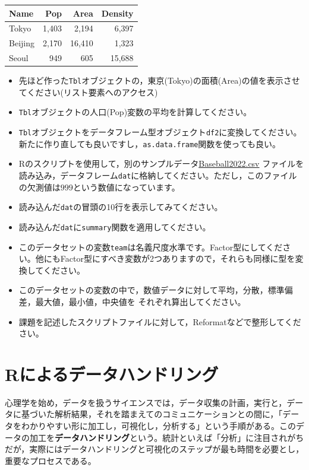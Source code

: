 \documentclass[
  a4paper,
]{ltjsbook}
\begin{document}
\begin{longtable}[]{@{}lrrr@{}}
\toprule\noalign{}
Name & Pop & Area & Density \\
\midrule\noalign{}
\endhead
\bottomrule\noalign{}
\endlastfoot
Tokyo & 1,403 & 2,194 & 6,397 \\
Beijing & 2,170 & 16,410 & 1,323 \\
Seoul & 949 & 605 & 15,688 \\
\end{longtable}

\begin{itemize}
\item
  先ほど作った\texttt{Tbl}オブジェクトの，東京(Tokyo)の面積(Area)の値を表示させてください(リスト要素へのアクセス)
\item
  \texttt{Tbl}オブジェクトの人口(Pop)変数の平均を計算してください。
\item
  \texttt{Tbl}オブジェクトをデータフレーム型オブジェクト\texttt{df2}に変換してください。新たに作り直しても良いですし，\texttt{as.data.frame}関数を使っても良い。
\item
  Rのスクリプトを使用して，別のサンプルデータ\url{Baseball2022.csv}
  ファイルを読み込み，データフレーム\texttt{dat}に格納してください。ただし，このファイルの欠測値は\(999\)という数値になっています。
\item
  読み込んだ\texttt{dat}の冒頭の10行を表示してみてください。
\item
  読み込んだ\texttt{dat}に\texttt{summary}関数を適用してください。
\item
  このデータセットの変数\texttt{team}は名義尺度水準です。Factor型にしてください。他にもFactor型にすべき変数が2つありますので，それらも同様に型を変換してください。
\item
  このデータセットの変数の中で，数値データに対して平均，分散，標準偏差，最大値，最小値，中央値を
  それぞれ算出してください。
\item
  課題を記述したスクリプトファイルに対して，Reformatなどで整形してください。
\end{itemize}


\chapter{Rによるデータハンドリング}\label{rux306bux3088ux308bux30c7ux30fcux30bfux30cfux30f3ux30c9ux30eaux30f3ux30b0}

心理学を始め，データを扱うサイエンスでは，データ収集の計画，実行と，データに基づいた解析結果，それを踏まえてのコミュニケーションとの間に，「データをわかりやすい形に加工し，可視化し，分析する」という手順がある。このデータの加工を\textbf{データハンドリング}という。統計といえば「分析」に注目されがちだが，実際にはデータハンドリングと可視化のステップが最も時間を必要とし，重要なプロセスである。
\end{document}
